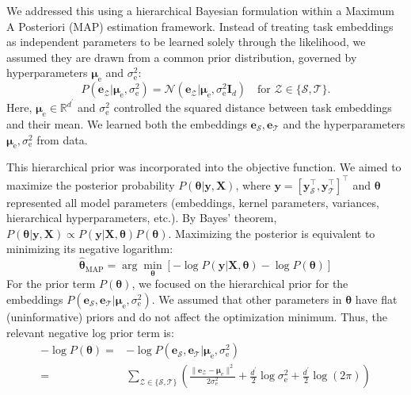 \documentclass[preprint,12pt]{elsarticle}
\begin{document}
We addressed this using a hierarchical Bayesian formulation within a Maximum A Posteriori (MAP) estimation framework. Instead of treating task embeddings as independent parameters to be learned solely through the likelihood, we assumed they are drawn from a common prior distribution, governed by hyperparameters $\bm{\mu}_{\text{e}}$ and $\sigma^2_{\text{e}}$:
\begin{equation}
    \label{eq:embedding_prior_dist}
    P(\mathbf{e}_\mathcal{Z} | \bm{\mu}_{\text{e}}, \sigma^2_{\text{e}}) = \mathcal{N}(\mathbf{e}_\mathcal{Z} | \bm{\mu}_{\text{e}}, \sigma^2_{\text{e}} \mathbf{I}_d) \quad \text{for } \mathcal{Z} \in \{\mathcal{S}, \mathcal{T}\}.
\end{equation}
Here, $\bm{\mu}_{\text{e}} \in \mathbb{R}^{d^\prime}$ and $\sigma^2_{\text{e}}$ controlled the squared distance between task embeddings and their mean. We learned both the embeddings $\mathbf{e}_\mathcal{S}, \mathbf{e}_\mathcal{T}$ and the hyperparameters $\bm{\mu}_{\text{e}}, \sigma^2_{\text{e}}$ from data.

This hierarchical prior was incorporated into the objective function. We aimed to maximize the posterior probability $P(\boldsymbol{\theta} | \mathbf{y}, \mathbf{X})$, where $\mathbf{y} = [\mathbf{y}_{\mathcal{S}}^\intercal, \mathbf{y}_{\mathcal{T}}^\intercal]^\intercal$ and $\boldsymbol{\theta}$ represented all model parameters (embeddings, kernel parameters, variances, hierarchical hyperparameters, etc.). By Bayes' theorem, $P(\boldsymbol{\theta} | \mathbf{y}, \mathbf{X}) \propto P(\mathbf{y} | \mathbf{X}, \boldsymbol{\theta}) P(\boldsymbol{\theta})$. Maximizing the posterior is equivalent to minimizing its negative logarithm:
\begin{equation}
    \label{eq:map_objective}
    \hat{\boldsymbol{\theta}}_{\text{MAP}} = \arg\min_{\boldsymbol{\theta}} \left[ -\log P(\mathbf{y} | \mathbf{X}, \boldsymbol{\theta}) - \log P(\boldsymbol{\theta}) \right]
\end{equation}
For the prior term $P(\boldsymbol{\theta})$, we focused on the hierarchical prior for the embeddings $P(\mathbf{e}_\mathcal{S}, \mathbf{e}_\mathcal{T} | \bm{\mu}_{\text{e}}, \sigma^2_{\text{e}})$. We assumed that other parameters in $\boldsymbol{\theta}$ have flat (uninformative) priors and do not affect the optimization minimum. Thus, the relevant negative log prior term is:
\begin{align}
    \label{eq:neg_log_prior_term}
    -\log P(\boldsymbol{\theta}) = &-\log P(\mathbf{e}_\mathcal{S}, \mathbf{e}_\mathcal{T} | \bm{\mu}_{\text{e}}, \sigma^2_{\text{e}})  \nonumber \\
    = &\sum_{\mathcal{Z} \in \{\mathcal{S}, \mathcal{T}\}} \left( \frac{\| \mathbf{e}_\mathcal{Z} - \bm\mu_{\text{e}} \|^2}{2\sigma^2_{\text{e}}} + \frac{d^\prime}{2} \log \sigma^2_{\text{e}} + \frac{d^\prime}{2} \log(2\pi) \right)
\end{align}
\end{document}
